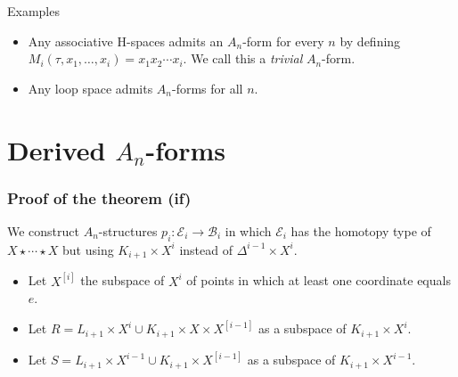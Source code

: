 \documentclass{beamer}
\theoremstyle{definition}
\begin{document}
\begin{frame}
\begin{block}{Examples}
\begin{itemize}
\item<1->Any associative H-spaces admits an $A_n$-form for every $n$ by defining $M_i(\tau,x_1,\dots,x_i)=x_1x_2\cdots x_i$. We call this a \emph{trivial} $A_n$-form.
\item<2-> Any loop space admits $A_n$-forms for all $n$.
\end{itemize}
\end{block}

\end{frame}


\section{Derived $A_n$-forms}

\begin{frame}
\frametitle{Proof of the theorem (if)}
We construct $A_n$-structures $p_i:\mathcal{E}_i\to \mathcal{B}_i$ in which $\mathcal{E}_i$ has the homotopy type of $X\star\cdots\star X$ but using $K_{i+1}\times X^i$ instead of $\Delta^{i-1}\times X^i$.
\begin{itemize}
\item<2-> Let $X^{[i]}$ the subspace of $X^i$ of points in which at least one coordinate equals $e$.
\item<3-> Let $R=L_{i+1}\times X^i\cup K_{i+1}\times X\times X^{[i-1]}$ as a subspace of $K_{i+1}\times X^i$.
\item<4-> Let $S=L_{i+1}\times X^{i-1}\cup K_{i+1}\times X^{[i-1]}$ as a subspace of $K_{i+1}\times X^{i-1}$.
\end{itemize}
\end{frame}
\end{document}
